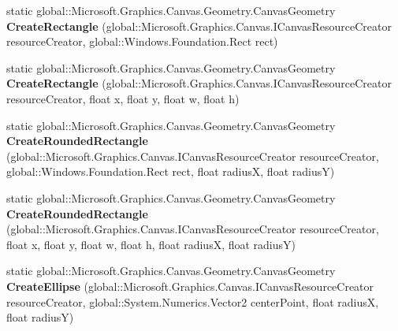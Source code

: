 \begin{DoxyCompactItemize}
static global\+::\+Microsoft.\+Graphics.\+Canvas.\+Geometry.\+Canvas\+Geometry {\bfseries Create\+Rectangle} (global\+::\+Microsoft.\+Graphics.\+Canvas.\+I\+Canvas\+Resource\+Creator resource\+Creator, global\+::\+Windows.\+Foundation.\+Rect rect)
\item 
\mbox{\label{class_microsoft_1_1_graphics_1_1_canvas_1_1_geometry_1_1_canvas_geometry_a09f20f98661ef071c60ef36ee6e9c383}} 
static global\+::\+Microsoft.\+Graphics.\+Canvas.\+Geometry.\+Canvas\+Geometry {\bfseries Create\+Rectangle} (global\+::\+Microsoft.\+Graphics.\+Canvas.\+I\+Canvas\+Resource\+Creator resource\+Creator, float x, float y, float w, float h)
\item 
\mbox{\label{class_microsoft_1_1_graphics_1_1_canvas_1_1_geometry_1_1_canvas_geometry_a009788642a98b2179cad9bba9b1965dd}} 
static global\+::\+Microsoft.\+Graphics.\+Canvas.\+Geometry.\+Canvas\+Geometry {\bfseries Create\+Rounded\+Rectangle} (global\+::\+Microsoft.\+Graphics.\+Canvas.\+I\+Canvas\+Resource\+Creator resource\+Creator, global\+::\+Windows.\+Foundation.\+Rect rect, float radiusX, float radiusY)
\item 
\mbox{\label{class_microsoft_1_1_graphics_1_1_canvas_1_1_geometry_1_1_canvas_geometry_a11c20ec470232154e23df2c9cb9c10dd}} 
static global\+::\+Microsoft.\+Graphics.\+Canvas.\+Geometry.\+Canvas\+Geometry {\bfseries Create\+Rounded\+Rectangle} (global\+::\+Microsoft.\+Graphics.\+Canvas.\+I\+Canvas\+Resource\+Creator resource\+Creator, float x, float y, float w, float h, float radiusX, float radiusY)
\item 
\mbox{\label{class_microsoft_1_1_graphics_1_1_canvas_1_1_geometry_1_1_canvas_geometry_a66008979f1f25a70e38f6044abf0aca6}} 
static global\+::\+Microsoft.\+Graphics.\+Canvas.\+Geometry.\+Canvas\+Geometry {\bfseries Create\+Ellipse} (global\+::\+Microsoft.\+Graphics.\+Canvas.\+I\+Canvas\+Resource\+Creator resource\+Creator, global\+::\+System.\+Numerics.\+Vector2 center\+Point, float radiusX, float radiusY)
\item 
\mbox{\label{class_microsoft_1_1_graphics_1_1_canvas_1_1_geometry_1_1_canvas_geometry_a60460178970082d9e7b6673b17fb88ec}} 

\end{DoxyCompactItemize}
